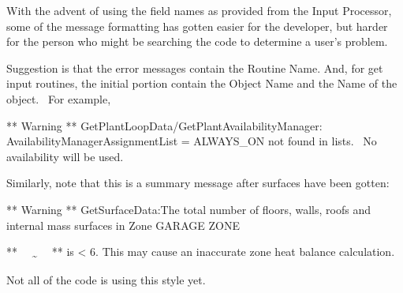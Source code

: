 With the advent of using the field names as provided from the Input Processor, some of the message formatting has gotten easier for the developer, but harder for the person who might be searching the code to determine a user's problem.

Suggestion is that the error messages contain the Routine Name. And, for get input routines, the initial portion contain the Object Name and the Name of the object.~ For example,

** Warning ** GetPlantLoopData/GetPlantAvailabilityManager: AvailabilityManagerAssignmentList = ALWAYS\_ON not found in lists.~ No availability will be used.

Similarly, note that this is a summary message after surfaces have been gotten:

** Warning ** GetSurfaceData:The total number of floors, walls, roofs and internal mass surfaces in Zone GARAGE ZONE

**~~ \textsubscript{\textasciitilde{}}~~ ** is \textless{} 6. This may cause an inaccurate zone heat balance calculation.

Not all of the code is using this style yet.

